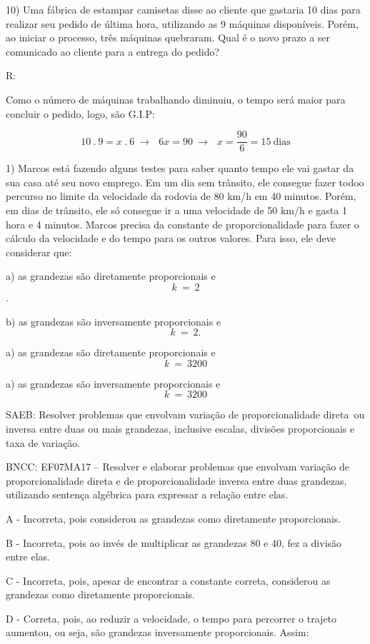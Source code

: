 10) Uma fábrica de estampar camisetas disse ao cliente que gastaria 10
dias para realizar seu pedido de última hora, utilizando as 9 máquinas
disponíveis. Porém, ao iniciar o processo, três máquinas quebraram. Qual
é o novo prazo a ser comunicado ao cliente para a entrega do pedido?

R:

Como o número de máquinas trabalhando diminuiu, o tempo será maior para
concluir o pedido, logo, são G.I.P:

\[10\ .\ 9 = x\ .\ 6\  \rightarrow \ \ \ 6x = 90\  \rightarrow \ \ \ x = \frac{90}{6} = 15\ \text{dias}\]


1) Marcos está fazendo alguns testes para saber quanto tempo ele vai
gastar da sua casa até seu novo emprego. Em um dia sem trânsito, ele
consegue fazer todoo percurso no limite da velocidade da rodovia de 80
km/h em 40 minutos. Porém, em dias de trânsito, ele só consegue ir a uma
velocidade de 50 km/h e gasta 1 hora e 4 minutos. Marcos precisa da
constante de proporcionalidade para fazer o cálculo da velocidade e do
tempo para os outros valores. Para isso, ele deve considerar que:

a) as grandezas são diretamente proporcionais e \[k\  = \ 2\].

b) as grandezas são inversamente proporcionais e \[k\  = \ 2.\]

a) as grandezas são diretamente proporcionais e \[k\  = \ 3200\]

a) as grandezas são inversamente proporcionais e \[k\  = \ 3200\]

SAEB: Resolver problemas que envolvam variação de proporcionalidade
direta~ou inversa entre duas ou mais grandezas, inclusive escalas,
divisões proporcionais e taxa de variação.

BNCC: EF07MA17 -- Resolver e elaborar problemas que envolvam variação de
proporcionalidade direta e de proporcionalidade inversa entre duas
grandezas, utilizando sentença algébrica para expressar a relação entre
elas.

A - Incorreta, pois considerou as grandezas como diretamente
proporcionais.

B - Incorreta, pois ao invés de multiplicar as grandezas 80 e 40, fez a
divisão entre elas.

C - Incorreta, pois, apesar de encontrar a constante correta, considerou
as grandezas como diretamente proporcionais.

D - Correta, pois, ao reduzir a velocidade, o tempo para percorrer o
trajeto aumentou, ou seja, são grandezas inversamente proporcionais.
Assim:


